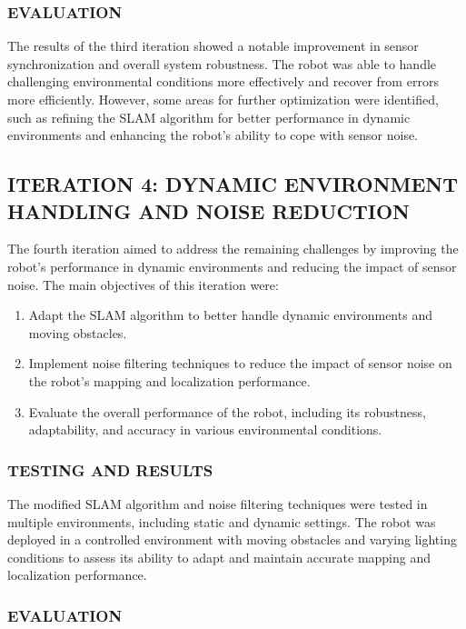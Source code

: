 \documentclass[12pt]{article}
\begin{document}
\subsubsection{EVALUATION}

The results of the third iteration showed a notable improvement in sensor synchronization and overall system robustness. The robot was able to handle challenging environmental conditions more effectively and recover from errors more efficiently. However, some areas for further optimization were identified, such as refining the SLAM algorithm for better performance in dynamic environments and enhancing the robot's ability to cope with sensor noise.

\subsection{ITERATION 4: DYNAMIC ENVIRONMENT HANDLING AND NOISE REDUCTION}

The fourth iteration aimed to address the remaining challenges by improving the robot's performance in dynamic environments and reducing the impact of sensor noise. The main objectives of this iteration were:

\begin{enumerate}
    \item Adapt the SLAM algorithm to better handle dynamic environments and moving obstacles.
    \item Implement noise filtering techniques to reduce the impact of sensor noise on the robot's mapping and localization performance.
    \item Evaluate the overall performance of the robot, including its robustness, adaptability, and accuracy in various environmental conditions.
\end{enumerate}

\subsubsection{TESTING AND RESULTS}

The modified SLAM algorithm and noise filtering techniques were tested in multiple environments, including static and dynamic settings. The robot was deployed in a controlled environment with moving obstacles and varying lighting conditions to assess its ability to adapt and maintain accurate mapping and localization performance.

\subsubsection{EVALUATION}
\end{document}
